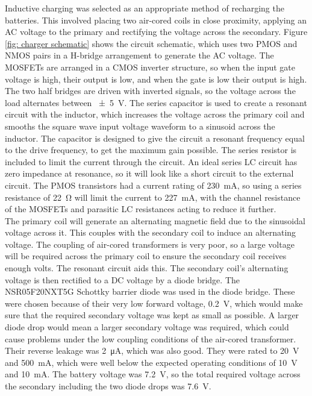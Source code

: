 Inductive charging was selected as an appropriate method of recharging the batteries. This involved placing two air-cored coils in close proximity, applying an AC voltage to the primary and rectifying the voltage across the secondary. Figure \ref{fig: charger schematic} shows the circuit schematic, which uses two PMOS and NMOS pairs in a H-bridge arrangement to generate the AC voltage. The MOSFETs are arranged in a CMOS inverter structure, so when the input gate voltage is high, their output is low, and when the gate is low their output is high. The two half bridges are driven with inverted signals, so the voltage across the load alternates between \SI{\pm 5}{\volt}. The series capacitor is used to create a resonant circuit with the inductor, which increases the voltage across the primary coil and smooths the square wave input voltage waveform to a sinusoid across the inductor. The capacitor is designed to give the circuit a resonant frequency equal to the drive frequency, to get the maximum gain possible. The series resistor is included to limit the current through the circuit. An ideal series LC circuit has zero impedance at resonance, so it will look like a short circuit to the external circuit. The PMOS transistors had a current rating of \SI{230}{\milli\ampere}, so using a series resistance of \SI{22}{\ohm} will limit the current to \SI{227}{\milli\ampere}, with the channel resistance of the MOSFETs and parasitic LC resistances acting to reduce it further.\\

The primary coil will generate an alternating magnetic field due to the sinusoidal voltage across it. This couples with the secondary coil to induce an alternating voltage. The coupling of air-cored transformers is very poor, so a large voltage will be required across the primary coil to ensure the secondary coil receives enough volts. The resonant circuit aids this. The secondary coil's alternating voltage is then rectified to a DC voltage by a diode bridge. The NSR05F20NXT5G Schottky barrier diode \cite{original_diode} was used in the diode bridge. These were chosen because of their very low forward voltage, \SI{0.2}{\volt}, which would make sure that the required secondary voltage was kept as small as possible. A larger diode drop would mean a larger secondary voltage was required, which could cause problems under the low coupling conditions of the air-cored transformer. Their reverse leakage was \SI{2}{\micro\ampere}, which was also good. They were rated to \SI{20}{\volt} and \SI{500}{\milli\ampere}, which were well below the expected operating conditions of \SI{10}{\volt} and \SI{10}{\milli\ampere}. The battery voltage was \SI{7.2}{\volt}, so the total required voltage across the secondary including the two diode drops was \SI{7.6}{\volt}.\\

